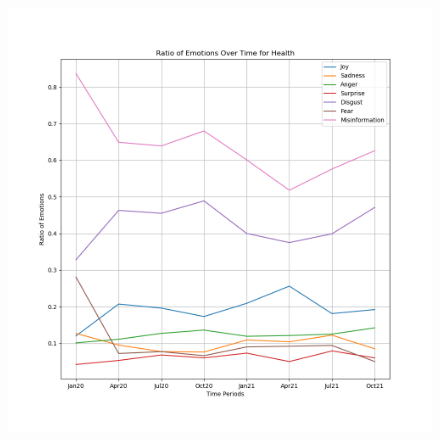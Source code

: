 \documentclass{l4proj}
\begin{document}
\begin{appendices}
\begin{figure}[H]
\begin{minipage}[c]{0.49\linewidth}
\includegraphics[width=\textwidth]{images/HealthEmotion.png}
\label{fig:healthemo}
\end{minipage}
\end{figure}


\end{appendices}
\end{document}
